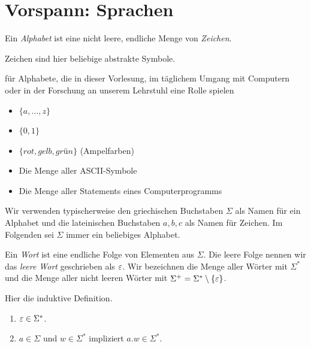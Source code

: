 \section[Vorspann: Sprachen]{Vorspann: Sprachen}
\begin{Def}[name={[Alphabet $\Sigma$]}]
	Ein \emph{Alphabet} ist eine nicht leere, endliche Menge von \emph{Zeichen}.
\end{Def} %
Zeichen sind hier beliebige abstrakte Symbole.

\newcommand{\aro}{\textit{rot}}
\newcommand{\age}{\textit{gelb}}
\newcommand{\agr}{\textit{grün}}

\begin{Bsp*} für Alphabete, die in dieser Vorlesung, im täglichem Umgang mit Computern oder in der Forschung an unserem Lehrstuhl eine Rolle spielen
  \begin{itemize}
  \item $\{a,\dots,z\}$
  \item $\{0, 1\}$
  \item $\{\aro, \age, \agr\}$ (Ampelfarben)
  \item Die Menge aller ASCII-Symbole
  \item Die Menge aller Statements eines Computerprogramms
  \qedhere
  \end{itemize}
\end{Bsp*}
Wir verwenden typischerweise den griechischen Buchstaben $\Sigma$ als Namen für ein Alphabet und die lateinischen Buchstaben $a,b,c$ als Namen für Zeichen.%
Im Folgenden sei $\Sigma$ immer ein beliebiges Alphabet.%

\begin{Def}[name={[Wort $w$ über $\Sigma$]}]\label{def:1.2}
  Ein \emph{Wort} ist eine endliche Folge von Elementen aus $\Sigma$.
  Die leere Folge nennen wir das \emph{leere Wort} geschrieben als $\varepsilon$.
  Wir bezeichnen die Menge aller Wörter mit $\Sigma^*$ und die Menge
  aller nicht leeren Wörter mit $\Sigma^+ =
  \Sigma^*\setminus\{\varepsilon\}$.

  Hier die induktive Definition.
  \begin{enumerate}
  \item $\varepsilon \in \Sigma^*$.
  \item $a \in \Sigma$ und $w \in \Sigma^*$ impliziert $a.w \in \Sigma^*$.
  \end{enumerate}
\end{Def}

